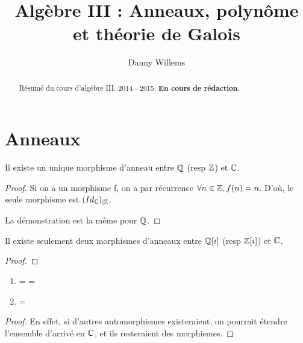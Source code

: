 \documentclass[a4paper, 12pt]{article}
\author{Danny Willems}
\title{Algèbre III : Anneaux, polynôme et théorie de Galois}
\begin{document}
\maketitle

\begin{abstract}
	Résumé du cours d'algèbre III. 2014 - 2015. \textbf{En cours de rédaction}.
\end{abstract}

\section{Anneaux}

\begin{proposition}
	Il existe un unique morphisme d'anneau entre $\mathbb{Q}$ (resp $\mathbb{Z}$)
	et $\mathbb{C}$.
\end{proposition}

\begin{proof}
	Si on a un morphisme f, on a par récurrence $\forall n \in \mathbb{Z}, f(n) =
	n$. D'où, le seule morphisme est $({Id_{\mathbb{C}}})_{|\mathbb{Z}}$.

	La démonstration est la même pour $\mathbb{Q}$.
\end{proof}

\begin{proposition}
	Il existe seulement deux morphismes d'anneaux entre $\mathbb{Q}[i]$ (resp
	$\mathbb{Z}[i]$) et $\mathbb{C}$.
\end{proposition}

\begin{proof}
\end{proof}

\begin{corollary}
	\begin{enumerate}
		\item {} =
			 = 
		\item {} = 
	\end{enumerate}
	\begin{proof}
	En effet, si d'autres automorphismes existeraient, on pourrait étendre
	l'ensemble d'arrivé en $\mathbb{C}$, et ils resteraient des morphismes.
	\end{proof}
\end{corollary}
\end{document}
